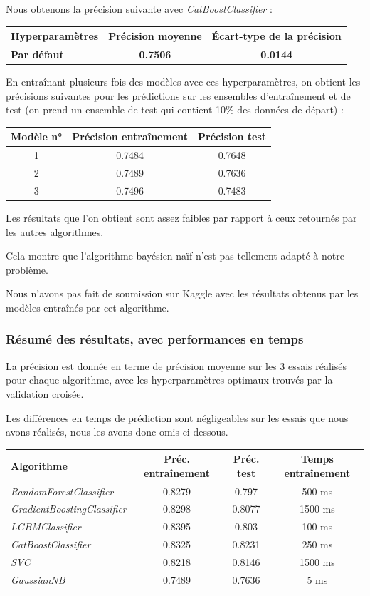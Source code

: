 \documentclass[a4paper]{article}
\begin{document}
    Nous obtenons la précision suivante avec {\it CatBoostClassifier} :

    \begin{tabular}{| l | *{2}{c|}}
        \hline
        Hyperparamètres & Précision moyenne & Écart-type de la précision
        \tabularnewline
        \hline
        \textbf{Par défaut} & \textbf{0.7506} & \textbf{0.0144}
        \tabularnewline
        \hline
    \end{tabular}

    En entraînant plusieurs fois des modèles avec ces hyperparamètres, on obtient les précisions suivantes pour les prédictions 
    sur les ensembles d'entraînement et de test (on prend un ensemble de test qui contient 10\% des données de départ) :

    \begin{tabular}{| *{3}{c|}}
        \hline
        Modèle n° & Précision entraînement & Précision test
        \tabularnewline
        \hline
        1 & 0.7484 & 0.7648
        \tabularnewline
        \hline
        2 & 0.7489 & 0.7636
        \tabularnewline
        \hline
        3 & 0.7496 & 0.7483
        \tabularnewline
        \hline
    \end{tabular}

    Les résultats que l'on obtient sont assez faibles par rapport à ceux retournés par les autres algorithmes.

    Cela montre que l'algorithme bayésien naïf n'est pas tellement adapté à notre problème.

    Nous n'avons pas fait de soumission sur Kaggle avec les résultats obtenus par les modèles
    entraînés par cet algorithme.

    \subsubsection{Résumé des résultats, avec performances en temps}

    La précision est donnée en terme de précision moyenne sur les 3 essais réalisés pour chaque algorithme,
    avec les hyperparamètres optimaux trouvés par la validation croisée.

    Les différences en temps de prédiction sont négligeables sur les essais que nous avons réalisés,
    nous les avons donc omis ci-dessous.

    \begin{tabular}{| l | *{3}{c|}}
        \hline
        Algorithme & Préc. entraînement & Préc. test & Temps entraînement
        \tabularnewline
        \hline
        {\it RandomForestClassifier} & 0.8279 & 0.797 & 500 ms
        \tabularnewline
        \hline
        {\it GradientBoostingClassifier} & 0.8298 & 0.8077 & 1500 ms
        \tabularnewline
        \hline
        {\it LGBMClassifier} & 0.8395 & 0.803 & 100 ms
        \tabularnewline
        \hline
        {\it CatBoostClassifier} & 0.8325 & 0.8231 & 250 ms
        \tabularnewline
        \hline
        {\it SVC} & 0.8218 & 0.8146 & 1500 ms
        \tabularnewline
        \hline
        {\it GaussianNB} & 0.7489 & 0.7636 & 5 ms
        \tabularnewline
        \hline
    \end{tabular}
\end{document}
